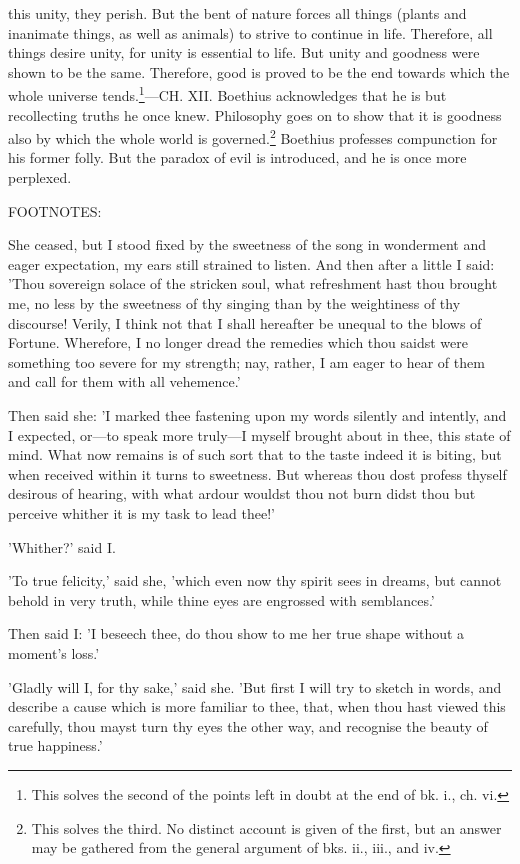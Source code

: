 this unity, they perish. But the bent of nature forces all things
(plants and inanimate things, as well as animals) to strive to
continue in life. Therefore, all things desire unity, for unity is
essential to life. But unity and goodness were shown to be the
same. Therefore, good is proved to be the end towards which the
whole universe tends.\footnote{This solves the second of the points left in doubt at the
end of bk. i., ch. vi.}—CH. XII. Boethius acknowledges that he is
but recollecting truths he once knew. Philosophy goes on to show
that it is goodness also by which the whole world is governed.\footnote{This solves the third. No distinct account is given of the
first, but an answer may be gathered from the general argument of bks.
ii., iii., and iv.}
Boethius professes compunction for his former folly. But the
paradox of evil is introduced, and he is once more perplexed.

FOOTNOTES:


She ceased, but I stood fixed by the sweetness of the song in wonderment
and eager expectation, my ears still strained to listen. And then after
a little I said: 'Thou sovereign solace of the stricken soul, what
refreshment hast thou brought me, no less by the sweetness of thy
singing than by the weightiness of thy discourse! Verily, I think not
that I shall hereafter be unequal to the blows of Fortune. Wherefore, I
no longer dread the remedies which thou saidst were something too severe
for my strength; nay, rather, I am eager to hear of them and call for
them with all vehemence.'

Then said she: 'I marked thee fastening upon my words silently and
intently, and I expected, or—to speak more truly—I myself brought
about in thee, this state of mind. What now remains is of such sort that
to the taste indeed it is biting, but when received within it turns to
sweetness. But whereas thou dost profess thyself desirous of hearing,
with what ardour wouldst thou not burn didst thou but perceive whither
it is my task to lead thee!'

'Whither?' said I.

'To true felicity,' said she, 'which even now thy spirit sees in dreams,
but cannot behold in very truth, while thine eyes are engrossed with
semblances.'

Then said I: 'I beseech thee, do thou show to me her true shape without
a moment's loss.'

'Gladly will I, for thy sake,' said she. 'But first I will try to sketch
in words, and describe a cause which is more familiar to thee, that,
when thou hast viewed this carefully, thou mayst turn thy eyes the other
way, and recognise the beauty of true happiness.'

